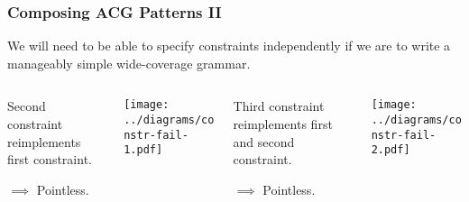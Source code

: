 \documentclass{beamer}
\begin{document}
\begin{frame}
  \frametitle{Composing ACG Patterns II}

  We will need to be able to specify constraints independently if we are
  to write a manageably simple wide-coverage grammar.

  \begin{columns}[c]
    \begin{column}{0.25\textwidth}
      Second constraint reimplements first constraint.

      $\implies$ Pointless.
    \end{column}
    \begin{column}{0.25\textwidth}
      \begin{center}
        \texttt{[image: ../diagrams/constr-fail-1.pdf]}
      \end{center}
    \end{column}
    \begin{column}{0.25\textwidth}
      Third constraint reimplements first and second constraint.

      $\implies$ Pointless.
    \end{column}
    \begin{column}{0.25\textwidth}
      \begin{center}
        \texttt{[image: ../diagrams/constr-fail-2.pdf]}
      \end{center}
    \end{column}
  \end{columns}
\end{frame}
\end{document}
